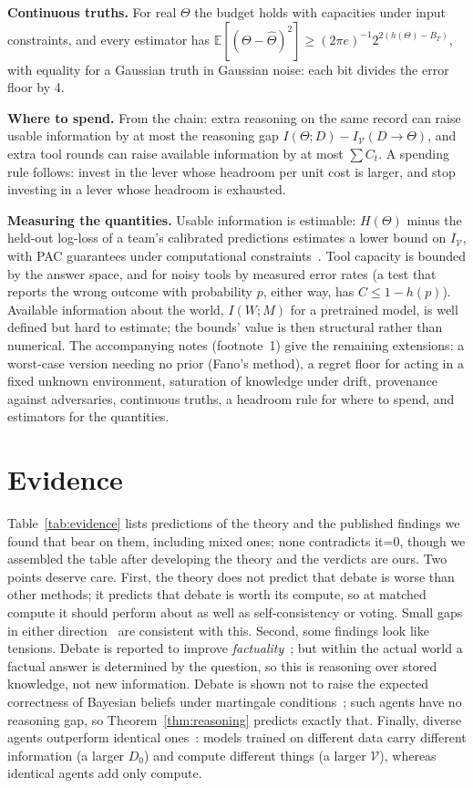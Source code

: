 \documentclass[conference]{IEEEtran}
\providecommand{\PaperShort}{0}  %
\theoremstyle{definition}
\newcommand{\I}{I}
\newcommand{\Hh}{H}
\newcommand{\E}{\mathbb{E}}
\newcommand{\V}{\mathcal V}
\begin{document}
\noindent\textbf{Continuous truths.} For real $\Theta$ the budget holds with
capacities under input constraints, and every estimator has
$\E[(\Theta-\hat\Theta)^2]\ge(2\pi e)^{-1}2^{2(h(\Theta)-B_T)}$, with equality for
a Gaussian truth in Gaussian noise: each bit divides the error floor by 4.

\noindent\textbf{Where to spend.} From the chain: extra reasoning on the same
record can raise usable information by at most the reasoning gap
$\I(\Theta;D)-\I_\V(D\to\Theta)$, and extra tool rounds can raise available
information by at most $\sum C_t$. A spending rule follows: invest in the lever
whose headroom per unit cost is larger, and stop investing in a lever whose
headroom is exhausted.

\noindent\textbf{Measuring the quantities.} Usable information is estimable:
$\Hh(\Theta)$ minus the held-out log-loss of a team's calibrated predictions
estimates a lower bound on $\I_\V$, with PAC guarantees under computational
constraints~\cite{xu2020}. Tool capacity is bounded by the answer space, and for
noisy tools by measured error rates (a test that reports the wrong outcome with
probability $p$, either way, has $C\le1-h(p)$). Available information about the world, $\I(W;M)$ for a pretrained
model, is well defined but hard to estimate; the bounds' value is then
structural rather than numerical.
\else
\noindent The accompanying notes (footnote~1) give the remaining extensions:
a worst-case version needing no prior (Fano's method), a regret floor for acting
in a fixed unknown environment, saturation of knowledge under drift, provenance
against adversaries, continuous truths, a headroom rule for where to spend, and
estimators for the quantities.
\fi

\section{Evidence}\label{sec:empirical}

Table~\ref{tab:evidence} lists predictions of the theory and the published
findings we found that bear on them, including mixed ones; none contradicts
it\ifnum\PaperShort=0, though we assembled the table after developing the theory and the verdicts are
ours\fi. Two points deserve care. First, the
theory does not predict that debate is worse than other methods; it predicts
that debate is worth its compute, so at matched compute it should perform about
as well as self-consistency or voting. Small gaps in either
direction~\cite{tran2026,smit2024,choi2025} are consistent with this. Second,
some findings look like tensions. Debate is reported to improve
\emph{factuality}~\cite{du2024}; but within the actual world a factual answer is
determined by the question, so this is reasoning over stored knowledge, not new
information. Debate is shown not to raise the expected correctness of Bayesian beliefs under
martingale conditions~\cite{choi2025}; such agents have no reasoning gap, so
Theorem~\ref{thm:reasoning} predicts exactly that. Finally, diverse agents outperform identical ones~\cite{yang2026}: models
trained on different data carry different information (a larger $D_0$) and
compute different things (a larger $\V$), whereas identical agents add only
compute.
\end{document}

